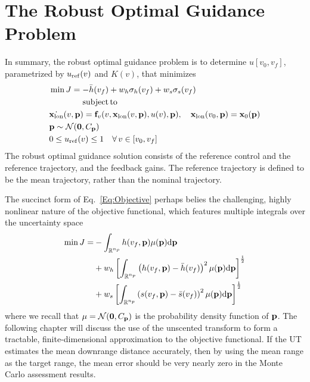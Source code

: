 \section{The Robust Optimal Guidance Problem}
In summary, the robust optimal guidance problem is to determine $u[v_0,v_f]$, parametrized by $u_{\mathrm{ref}}(v)$ and $K(v)$, that minimizes
\begin{align}
	&\min J = -\bar{h}(v_f) + w_h\sigma_h(v_f) + w_s\sigma_s(v_f) \nonumber\\
	&\quad\quad\qquad\mathrm{subject\, to }\nonumber \\
	&\dot{\mathbf{x}_{\mathrm{lon}}}(v,\mathbf{p}) = \mathbf{f}_v(v, \mathbf{x}_{\mathrm{lon}}(v,\mathbf{p}), u(v), \mathbf{p}),\quad
	\mathbf{x}_{\mathrm{lon}}(v_0,\mathbf{p}) = \mathbf{x}_0(\mathbf{p}) \nonumber\\
	&\mathbf{p}\sim \mathcal{N}(\mathbf{0},C_{\mathbf{p}}) \nonumber\\
	&0 \le u_{\mathrm{ref}}(v) \le 1 \quad \forall\,v\in [v_0, v_f] \nonumber
\end{align}
The robust optimal guidance solution consists of the reference control and the reference trajectory, and the feedback gains. The reference trajectory is defined to be the mean trajectory, rather than the nominal trajectory. 

The succinct form of Eq.~\eqref{Eq:Objective} perhaps belies the challenging, highly nonlinear nature of the objective functional, which features multiple integrals over the uncertainty space
\begin{align}
	\min J = &-\int_{\mathbb{R}^{n_p}}h(v_f,\mathbf{p})\mu(\mathbf{p})\mathrm{d}\mathbf{p} \nonumber\\
	&+ w_h\left[\int_{\mathbb{R}^{n_p}}\left(h(v_f,\mathbf{p}) - \bar{h}(v_f)\right)^2\mu(\mathbf{p})\mathrm{d}\mathbf{p}\right]^{\frac{1}{2}} \\
	&+ w_s\left[\int_{\mathbb{R}^{n_p}}\left(s(v_f,\mathbf{p}) - \bar{s}(v_f)\right)^2\mu(\mathbf{p})\mathrm{d}\mathbf{p}\right]^{\frac{1}{2}}\nonumber
\end{align}
where we recall that $\mu = \mathcal{N}(\mathbf{0},C_{\mathbf{p}})$ is the probability density function of $\mathbf{p}$. The following chapter will discuss the use of the unscented transform to form a tractable, finite-dimensional approximation to the objective functional. If the UT estimates the mean downrange distance accurately, then by using the mean range as the target range, the mean error should be very nearly zero in the Monte Carlo assessment results. 

